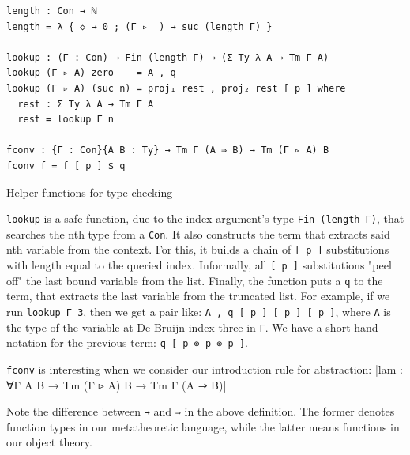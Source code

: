 \begin{listing}[H]
\begin{verbatim}
length : Con → ℕ
length = λ { ◇ → 0 ; (Γ ▹ _) → suc (length Γ) }

lookup : (Γ : Con) → Fin (length Γ) → (Σ Ty λ A → Tm Γ A)
lookup (Γ ▹ A) zero    = A , q
lookup (Γ ▹ A) (suc n) = proj₁ rest , proj₂ rest [ p ] where
  rest : Σ Ty λ A → Tm Γ A
  rest = lookup Γ n

fconv : {Γ : Con}{A B : Ty} → Tm Γ (A ⇒ B) → Tm (Γ ▹ A) B
fconv f = f [ p ] $ q

\end{verbatim}
\caption{Helper functions for type checking}
\label{code:typecheck-helpers}
\end{listing}

\verb$lookup$ is a safe function, due to the index argument's type \verb$Fin (length Γ)$, that searches the nth type from a \verb$Con$. It also constructs the term that extracts said nth variable from the context. For this, it builds a chain of \verb$[ p ]$ substitutions with length equal to the queried index. Informally, all \verb$[ p ]$ substitutions "peel off" the last bound variable from the list. Finally, the function puts a \verb$q$ to the term, that extracts the last variable from the truncated list. For example, if we run \verb$lookup Γ 3$, then we get a pair like: \verb$A , q [ p ] [ p ] [ p ]$, where \verb$A$ is the type of the variable at De Bruijn index three in \verb$Γ$. We have a short-hand notation for the previous term: \verb$q [ p ⊚ p ⊚ p ]$.

\verb$fconv$ is interesting when we consider our introduction rule for abstraction:
|lam : ∀{Γ A B} → Tm (Γ ▹ A) B → Tm Γ (A ⇒ B)|

Note the difference between \verb$→$ and \verb$⇒$ in the above definition. The former denotes function types in our metatheoretic language, while the latter means functions in our object theory.

